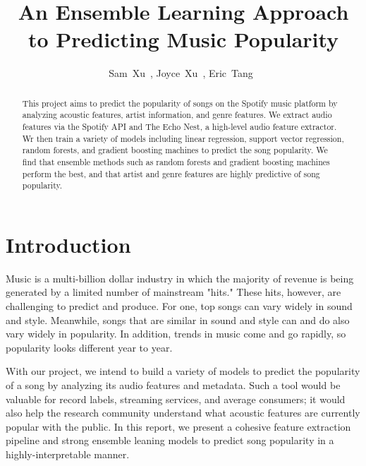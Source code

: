 \documentclass[journal]{IEEEtran}
\begin{document}
%
\title{An Ensemble Learning Approach to Predicting Music Popularity}


\author{Sam~Xu~,
        Joyce~Xu~,
        Eric~Tang~}


%
{}


\maketitle


\begin{abstract}
This project aims to predict the popularity of songs on the Spotify music platform by analyzing acoustic features, artist information, and genre features. We extract audio features via the Spotify API and The Echo Nest, a high-level audio feature extractor. Wr then train a variety of models including linear regression, support vector regression, random forests, and gradient boosting machines to predict the song popularity. We find that ensemble methods such as random forests and gradient boosting machines perform the best, and that artist and genre features are highly predictive of song popularity.
\end{abstract}



\section{Introduction}
Music is a multi-billion dollar industry in which the majority of revenue is being generated by a limited number of mainstream "hits." These hits, however, are challenging to predict and produce. For one, top songs can vary widely in sound and style. Meanwhile, songs that are similar in sound and style can and do also vary widely in popularity. In addition, trends in music come and go rapidly, so popularity looks different year to year.

With our project, we intend to build a variety of models to predict the popularity of a song by analyzing its audio features and metadata. Such a tool would be valuable for record labels, streaming services, and average consumers; it would also help the research community understand what acoustic features are currently popular with the public. In this report, we present a cohesive feature extraction pipeline and strong ensemble leaning models to predict song popularity in a highly-interpretable manner.
\end{document}
